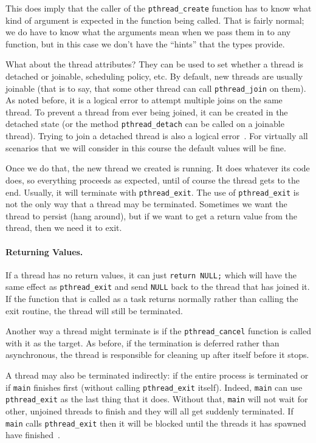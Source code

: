 This does imply that the caller of the \texttt{pthread\_create} function has to know what kind of argument is expected in the function being called. That is fairly normal; we do have to know what the arguments mean when we pass them in to any function, but in this case we don't have the ``hints'' that the types provide.

What about the thread attributes? They can be used to set whether a thread is detached or joinable, scheduling policy, etc. By default, new threads are usually joinable (that is to say, that some other thread can call \texttt{pthread\_join} on them). As noted before, it is a logical error to attempt multiple joins on the same thread. To prevent a thread from ever being joined, it can be created in the detached state (or the method \texttt{pthread\_detach} can be called on a joinable thread). Trying to join a detached thread is also a logical error~\cite{pthreads}. For virtually all scenarios that we will consider in this course the default values will be fine.

Once we do that, the new thread we created is running. It does whatever its code does, so everything proceeds as expected, until of course the thread gets to the end. Usually, it will terminate with \texttt{pthread\_exit}. The use of \texttt{pthread\_exit} is not the only way that a thread may be terminated. Sometimes we want the thread to persist (hang around), but if we want to get a return value from the thread, then we need it to exit.

\paragraph{Returning Values.} If a thread has no return values, it can just \texttt{return NULL;} which will have the same effect as \texttt{pthread\_exit} and send \texttt{NULL} back to the thread that has joined it. If the function that is called as a task returns normally rather than calling the exit routine, the thread will still be terminated.

Another way a thread might terminate is if the \texttt{pthread\_cancel} function is called with it as the target. As before, if the termination is deferred rather than asynchronous, the thread is responsible for cleaning up after itself before it stops.

A thread may also be terminated indirectly: if the entire process is terminated or if \texttt{main} finishes first (without calling \texttt{pthread\_exit} itself). Indeed, \texttt{main} can use \texttt{pthread\_exit} as the last thing that it does. Without that, \texttt{main} will not wait for other, unjoined threads to finish and they will all get suddenly terminated. If \texttt{main} calls \texttt{pthread\_exit} then it will be blocked until the threads it has spawned have finished~\cite{pthreads}.

